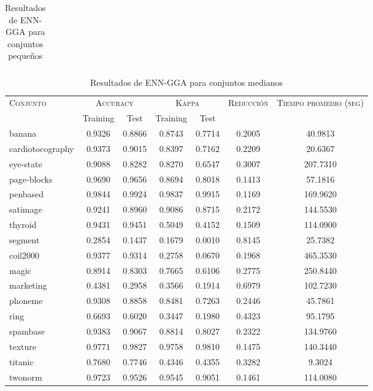\begin{table}[]
\begin{tabular}{l c c c c c c}
\hline
\end{tabular}
\caption{Resultados de ENN-GGA para conjuntos pequeños }
\label{res-peq-enn-gga}
\end{table}



\begin{table}[]
\centering
\begin{tabular}{l c c c c c c}
\hline
\multirow{2}{*}{\textsc{Conjunto}}
	& \multicolumn{2}{c}{\textsc{Accuracy}}
	& \multicolumn{2}{c}{\textsc{Kappa}}
	& \textsc{Reducción}
	& \textsc{Tiempo promedio (seg)} \\
	& Training & Test
	& Training & Test \\ 
\hline
\hline

banana & 0.9326 & 0.8866 & 0.8743 & 0.7714 & 0.2005 & 40.9813 \\
cardiotocography & 0.9373 & 0.9015 & 0.8397 & 0.7162 & 0.2209 & 20.6367 \\
eye-state & 0.9088 & 0.8282 & 0.8270 & 0.6547 & 0.3007 & 207.7310 \\
page-blocks & 0.9690 & 0.9656 & 0.8694 & 0.8018 & 0.1413 & 57.1816 \\
penbased & 0.9844 & 0.9924 & 0.9837 & 0.9915 & 0.1169 & 169.9620 \\
satimage & 0.9241 & 0.8960 & 0.9086 & 0.8715 & 0.2172 & 144.5530 \\
thyroid & 0.9431 & 0.9451 & 0.5049 & 0.4152 & 0.1509 & 114.0900 \\
segment & 0.2854 & 0.1437 & 0.1679 & 0.0010 & 0.8145 & 25.7382 \\
coil2000 & 0.9377 & 0.9314 & 0.2758 & 0.0670 & 0.1968 & 465.3530 \\
magic & 0.8914 & 0.8303 & 0.7665 & 0.6106 & 0.2775 & 250.8440 \\
marketing & 0.4381 & 0.2958 & 0.3566 & 0.1914 & 0.6979 & 102.7230 \\
phoneme & 0.9308 & 0.8858 & 0.8481 & 0.7263 & 0.2446 & 45.7861 \\
ring & 0.6693 & 0.6020 & 0.3447 & 0.1980 & 0.4323 & 95.1795 \\
spambase & 0.9383 & 0.9067 & 0.8814 & 0.8027 & 0.2322 & 134.9760 \\
texture & 0.9771 & 0.9827 & 0.9758 & 0.9810 & 0.1475 & 140.3440 \\
titanic & 0.7680 & 0.7746 & 0.4346 & 0.4355 & 0.3282 & 9.3024 \\
twonorm & 0.9723 & 0.9526 & 0.9545 & 0.9051 & 0.1461 & 114.0080 \\

\hline
\end{tabular}
\caption{Resultados de ENN-GGA para conjuntos medianos }
\label{res-med-enn-gga}
\end{table}



